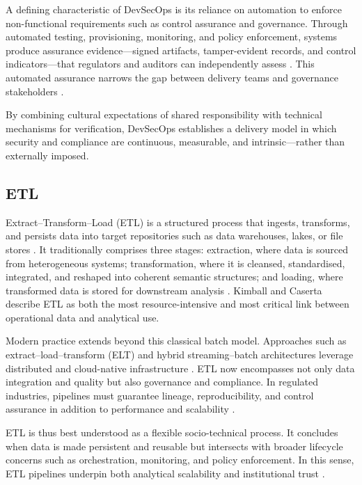 A defining characteristic of DevSecOps is its reliance on automation to enforce
non-functional requirements such as control assurance and governance. Through
automated testing, provisioning, monitoring, and policy enforcement, systems
produce assurance evidence—signed artifacts, tamper-evident records, and control
indicators—that regulators and auditors can independently assess
\cite{zhou_towards_2020, anisetti_devsecops-based_2022}. This automated
assurance narrows the gap between delivery teams and governance stakeholders
\cite{anisetti_semi-automatic_2020}.

By combining cultural expectations of shared responsibility with technical
mechanisms for verification, DevSecOps establishes a delivery model in which
security and compliance are continuous, measurable, and intrinsic—rather than
externally imposed.


\subsection*{ETL}
\noindent
Extract–Transform–Load (ETL) is a structured process that ingests, transforms,
and persists data into target repositories such as data warehouses, lakes, or
file stores \cite{kimball_data_2004}. It traditionally comprises three stages:
extraction, where data is sourced from heterogeneous systems; transformation,
where it is cleansed, standardised, integrated, and reshaped into coherent
semantic structures; and loading, where transformed data is stored for
downstream analysis \cite{kimball_data_2004}. Kimball and Caserta describe ETL
as both the most resource-intensive and most critical link between operational
data and analytical use.

Modern practice extends beyond this classical batch model. Approaches such as
extract–load–transform (ELT) and hybrid streaming–batch architectures leverage
distributed and cloud-native infrastructure \cite{mahmud_role_2022}. ETL now
encompasses not only data integration and quality but also governance and
compliance. In regulated industries, pipelines must guarantee lineage,
reproducibility, and control assurance in addition to performance and
scalability \cite{mahmud_role_2022}.

ETL is thus best understood as a flexible socio-technical process. It concludes
when data is made persistent and reusable but intersects with broader lifecycle
concerns such as orchestration, monitoring, and policy enforcement. In this
sense, ETL pipelines underpin both analytical scalability and institutional
trust \cite{mahmud_role_2022}.

